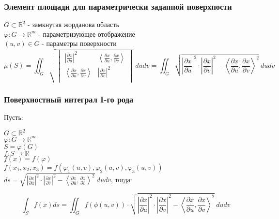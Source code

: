 \subsubsection{Элемент площади для параметрически заданной поверхности}
    \begin{theorem*}
    $G \subset \mathbb{R}^2$ - замкнутая жорданова область\\
    $\varphi: G \rightarrow \mathbb{R}^m$ - параметризующее отображение\\
    $(u, v) \in G$ - параметры поверхности\\
    $$\mu(S) = \iint_G \sqrt{
    \begin{vmatrix}
    \left|\frac{\partial x}{\partial u}\right|^2 & \left\langle \frac{\partial x}{\partial u}, \frac{\partial x}{\partial v}\right\rangle \\
    \left\langle \frac{\partial x}{\partial u}, \frac{\partial x}{\partial v}\right\rangle  & \left|\frac{\partial x}{\partial v}\right|^2\\
    \end{vmatrix}
    }\ dudv = \iint_G \sqrt{\left|\frac{\partial x}{\partial u}\right|^2 \cdot \left|\frac{\partial x}{\partial v}\right|^2 - \left\langle \frac{\partial x}{\partial u}, \frac{\partial x}{\partial v}\right\rangle ^2}\ dudv$$
    \end{theorem*}
\subsubsection{Поверхностный интеграл I-го рода}
    \begin{theorem*}
        Пусть:

        $G \subset \mathbb{R}^2$\\
        $\varphi: G \rightarrow \mathbb{R}^m$\\
        $S = \varphi(G)$\\
        $f: S \rightarrow \mathbb{R}$\\
        $f(x) = f(\varphi)$\\
        $f(x_1, x_2, x_3) = f(\varphi_1(u, v), \varphi_2(u, v), \varphi_3(u, v))$\\
        $ds = \sqrt{\left|\frac{\partial x}{\partial u}\right|^2 \cdot \left|\frac{\partial x}{\partial v}\right|^2 - \left\langle \frac{\partial x}{\partial u}, \frac{\partial x}{\partial v}\right\rangle ^2}\ dudv$, тогда:
        
        $$\int_S f(x) ds = \iint_G f(\phi(u, v)) \cdot \sqrt{\left|\frac{\partial x}{\partial u}\right|^2 \cdot \left|\frac{\partial x}{\partial v}\right|^2 - \left\langle \frac{\partial x}{\partial u}, \frac{\partial x}{\partial v}\right\rangle ^2}\ dudv$$        
    \end{theorem*}
